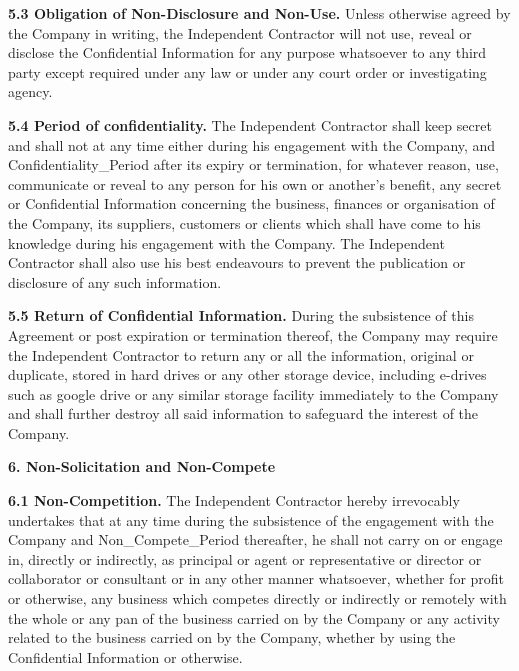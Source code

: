 \documentclass[12pt]{article}
\begin{document}
\vspace{0.5em}
\noindent
\textbf{5.3 Obligation of Non-Disclosure and Non-Use.} Unless otherwise agreed by the Company in writing, the Independent Contractor will not use, reveal or disclose the Confidential Information for any purpose whatsoever to any third party except required under any law or under any court order or investigating agency.

\vspace{0.5em}
\noindent
\textbf{5.4 Period of confidentiality.} The Independent Contractor shall keep secret and shall not at any time either during his engagement with the Company, and {{Confidentiality_Period}} after its expiry or termination, for whatever reason, use, communicate or reveal to any person for his own or another's benefit, any secret or Confidential Information concerning the business, finances or organisation of the Company, its suppliers, customers or clients which shall have come to his knowledge during his engagement with the Company. The Independent Contractor shall also use his best endeavours to prevent the publication or disclosure of any such information.

\vspace{0.5em}
\noindent
\textbf{5.5 Return of Confidential Information.} During the subsistence of this Agreement or post expiration or termination thereof, the Company may require the Independent Contractor to return any or all the information, original or duplicate, stored in hard drives or any other storage device, including e-drives such as google drive or any similar storage facility immediately to the Company and shall further destroy all said information to safeguard the interest of the Company.

\vspace{1em}
\noindent
\textbf{6. Non-Solicitation and Non-Compete}

\vspace{0.5em}
\noindent
\textbf{6.1 Non-Competition.} The Independent Contractor hereby irrevocably undertakes that at any time during the subsistence of the engagement with the Company and {{Non_Compete_Period}} thereafter, he shall not carry on or engage in, directly or indirectly, as principal or agent or representative or director or collaborator or consultant or in any other manner whatsoever, whether for profit or otherwise, any business which competes directly or indirectly or remotely with the whole or any pan of the business carried on by the Company or any activity related to the business carried on by the Company, whether by using the Confidential Information or otherwise.
\end{document}
